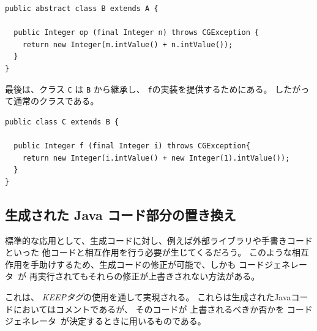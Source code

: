 \documentclass[\pformat,11pt]{jarticle}
\newcommand{\tcg}{コードジェネレータ}
\begin{document}
\begin{screen}
\begin{verbatim}
public abstract class B extends A {

  public Integer op (final Integer n) throws CGException {
    return new Integer(m.intValue() + n.intValue());
  }
}
\end{verbatim}
\end{screen}

最後は、クラス \texttt{C} は \texttt{B} から継承し、 \texttt{f}の実装を提供するためにある。
したがって通常のクラスである。
\begin{screen}
\begin{verbatim}
public class C extends B {
 
  public Integer f (final Integer i) throws CGException{
    return new Integer(i.intValue() + new Integer(1).intValue());
  }
} 
\end{verbatim}
\end{screen}


\subsection{生成された Java コード部分の置き換え}\label{substituting}

標準的な応用として、生成コードに対し、例えば外部ライブラリや手書きコードといった
他コードと相互作用を行う必要が生じてくるだろう。
このような相互作用を手助けするため、生成コードの修正が可能で、しかも \tcg\ が
再実行されてもそれらの修正が上書きされない方法がある。

これは、 \textit{KEEPタグ}の使用を通して実現される。
これらは生成されたJavaコードにおいてはコメントであるが、 そのコードが
上書されるべきか否かを \tcg\ が決定するときに用いるものである。
\end{document}

